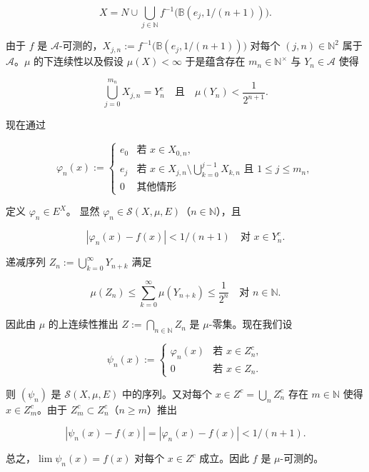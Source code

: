 \begin{theorem}
\begin{subitems}
\[
X = N \cup \bigcup_{j \in \mathbb{N}} f^{-1}\bigl(\mathbb{B}(e_j,1/(n+1))\bigr) .
\]

由于 $ f $ 是 $ \mathcal{A} $-可测的，$ X_{j,n} := f^{-1}\bigl(\mathbb{B}(e_j,1/(n+1))\bigr) $ 对每个 $ (j,n) \in \mathbb{N}^2 $ 属于 $ \mathcal{A} $。$ \mu $ 的下连续性以及假设 $ \mu(X) < \infty $ 于是蕴含存在 $ m_n \in \mathbb{N}^\times $ 与 $ Y_n \in \mathcal{A} $ 使得

\[
\bigcup_{j=0}^{m_n} X_{j,n} = Y_n^c \quad \text{且} \quad \mu(Y_n) < \frac{1}{2^{n+1}} .
\]

现在通过

\begin{equation*}
\varphi_n(x) := \begin{cases} e_0 & \text{若 } x \in X_{0,n} , \\ e_j & \text{若 } x \in X_{j,n} \setminus \bigcup_{k=0}^{j-1} X_{k,n} \text{ 且 } 1 \le j \le m_n , \\ 0 & \text{其他情形} \end{cases}
\end{equation*}

定义 $ \varphi_n \in E^X $。
显然 $ \varphi_n \in \mathcal{S}(X,\mu,E) $（$ n \in \mathbb{N} $），且

\[
|\varphi_n(x) - f(x)| < 1/(n+1) \quad \text{对 } x \in Y_n^c .
\]

递减序列 $ Z_n := \bigcup_{k=0}^{\infty} Y_{n+k} $ 满足

\[
\mu(Z_n) \le \sum_{k=0}^{\infty} \mu(Y_{n+k}) \le \frac{1}{2^n} \quad \text{对 } n \in \mathbb{N} .
\]

因此由 $ \mu $ 的上连续性推出 $ Z := \bigcap_{n \in \mathbb{N}} Z_n $ 是 $ \mu $-零集。现在我们设

\begin{equation*}
\psi_n(x) := \begin{cases} \varphi_n(x) & \text{若 } x \in Z_n^c , \\ 0 & \text{若 } x \in Z_n . \end{cases}
\end{equation*}

则 $ (\psi_n) $ 是 $ \mathcal{S}(X,\mu,E) $ 中的序列。又对每个 $ x \in Z^c = \bigcup_n Z_n^c $ 存在 $ m \in \mathbb{N} $ 使得 $ x \in Z_m^c $。由于 $ Z_m^c \subset Z_n^c $（$ n \ge m $）推出

\[
|\psi_n(x) - f(x)| = |\varphi_n(x) - f(x)| < 1/(n+1) .
\]

总之，$ \lim \psi_n(x) = f(x) $ 对每个 $ x \in Z^c $ 成立。因此 $ f $ 是 $ \mu $-可测的。


\end{subitems}
\end{theorem}
